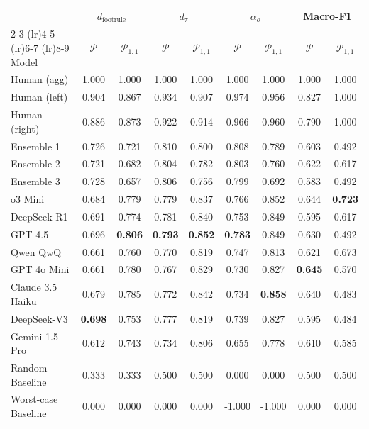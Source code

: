 \begin{tabular}{lcccccccc}
\toprule
 & \multicolumn{2}{c}{$d_\text{footrule}$} & \multicolumn{2}{c}{$d_\tau$} & \multicolumn{2}{c}{$\alpha_o$} & \multicolumn{2}{c}{Macro-F1} \\
\cmidrule(lr){2-3} \cmidrule(lr){4-5} \cmidrule(lr){6-7} \cmidrule(lr){8-9}
Model & $\mathcal{P}$ & $\mathcal{P}_{1,1}$ & $\mathcal{P}$ & $\mathcal{P}_{1,1}$ & $\mathcal{P}$ & $\mathcal{P}_{1,1}$ & $\mathcal{P}$ & $\mathcal{P}_{1,1}$ \\
\midrule
Human (agg) & 1.000 & 1.000 & 1.000 & 1.000 & 1.000 & 1.000 & 1.000 & 1.000 \\
Human (left) & 0.904 & 0.867 & 0.934 & 0.907 & 0.974 & 0.956 & 0.827 & 1.000 \\
Human (right) & 0.886 & 0.873 & 0.922 & 0.914 & 0.966 & 0.960 & 0.790 & 1.000 \\
\midrule
Ensemble 1 & 0.726 & 0.721 & 0.810 & 0.800 & 0.808 & 0.789 & 0.603 & 0.492 \\
Ensemble 2 & 0.721 & 0.682 & 0.804 & 0.782 & 0.803 & 0.760 & 0.622 & 0.617 \\
Ensemble 3 & 0.728 & 0.657 & 0.806 & 0.756 & 0.799 & 0.692 & 0.583 & 0.492 \\
\midrule
o3 Mini & 0.684 & 0.779 & 0.779 & 0.837 & 0.766 & 0.852 & 0.644 & \textbf{0.723} \\
DeepSeek-R1 & 0.691 & 0.774 & 0.781 & 0.840 & 0.753 & 0.849 & 0.595 & 0.617 \\
GPT 4.5 & 0.696 & \textbf{0.806} & \textbf{0.793} & \textbf{0.852} & \textbf{0.783} & 0.849 & 0.630 & 0.492 \\
Qwen QwQ & 0.661 & 0.760 & 0.770 & 0.819 & 0.747 & 0.813 & 0.621 & 0.673 \\
GPT 4o Mini & 0.661 & 0.780 & 0.767 & 0.829 & 0.730 & 0.827 & \textbf{0.645} & 0.570 \\
Claude 3.5 Haiku & 0.679 & 0.785 & 0.772 & 0.842 & 0.734 & \textbf{0.858} & 0.640 & 0.483 \\
DeepSeek-V3 & \textbf{0.698} & 0.753 & 0.777 & 0.819 & 0.739 & 0.827 & 0.595 & 0.484 \\
Gemini 1.5 Pro & 0.612 & 0.743 & 0.734 & 0.806 & 0.655 & 0.778 & 0.610 & 0.585 \\
\midrule
Random Baseline & 0.333 & 0.333 & 0.500 & 0.500 & 0.000 & 0.000 & 0.500 & 0.500 \\
Worst-case Baseline & 0.000 & 0.000 & 0.000 & 0.000 & -1.000 & -1.000 & 0.000 & 0.000 \\
\bottomrule
\end{tabular}